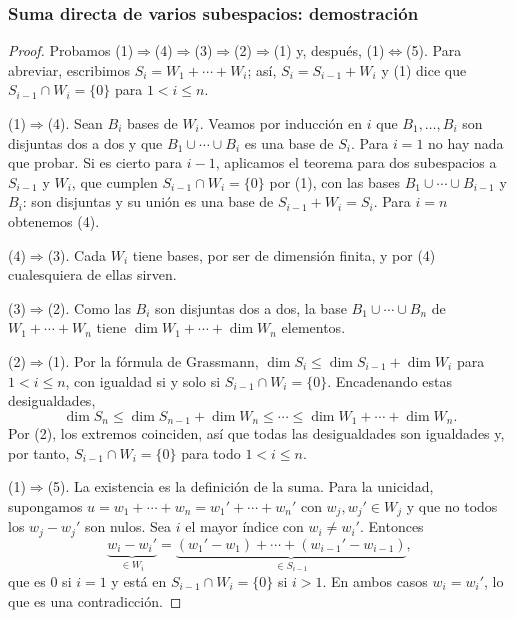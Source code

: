 \begin{frame}[allowframebreaks, t]
    \frametitle{Suma directa de varios subespacios: demostración}

    \begin{proof}
        Probamos (1)$\Rightarrow$(4)$\Rightarrow$(3)$\Rightarrow$(2)$\Rightarrow$(1)
        y, después, (1)$\Leftrightarrow$(5). Para abreviar, escribimos
        $S_i=W_1+\cdots+W_i$; así, $S_i=S_{i-1}+W_i$ y (1) dice que
        $S_{i-1}\cap W_i=\{0\}$ para $1<i\leq n$.

        \alert{(1)$\Rightarrow$(4).} Sean $B_i$ bases de $W_i$. Veamos por
        inducción en $i$ que $B_1,\ldots,B_i$ son disjuntas dos a dos y que
        $B_1\cup\cdots\cup B_i$ es una base de $S_i$. Para $i=1$ no hay
        nada que probar. Si es cierto para $i-1$, aplicamos el teorema para
        dos subespacios a $S_{i-1}$ y $W_i$, que cumplen
        $S_{i-1}\cap W_i=\{0\}$ por (1), con las bases
        $B_1\cup\cdots\cup B_{i-1}$ y $B_i$: son disjuntas y su unión es una
        base de $S_{i-1}+W_i=S_i$. Para $i=n$ obtenemos (4).

        \medskip

        \alert{(4)$\Rightarrow$(3).} Cada $W_i$ tiene bases, por ser de
        dimensión finita, y por (4) cualesquiera de ellas sirven.

        \medskip

        \alert{(3)$\Rightarrow$(2).} Como las $B_i$ son disjuntas dos a dos,
        la base $B_1\cup\cdots\cup B_n$ de $W_1+\cdots+W_n$ tiene
        $\dim W_1+\cdots+\dim W_n$ elementos.

        \framebreak

        \alert{(2)$\Rightarrow$(1).} Por la fórmula de Grassmann,
        $\dim S_i\leq\dim S_{i-1}+\dim W_i$ para $1<i\leq n$, con igualdad
        si y solo si $S_{i-1}\cap W_i=\{0\}$. Encadenando estas
        desigualdades,
        \[
            \dim S_n\leq\dim S_{n-1}+\dim W_n\leq\cdots
            \leq\dim W_1+\cdots+\dim W_n.
        \]
        Por (2), los extremos coinciden, así que todas las desigualdades
        son igualdades y, por tanto, $S_{i-1}\cap W_i=\{0\}$ para todo
        $1<i\leq n$.

        \medskip

        \alert{(1)$\Rightarrow$(5).} La existencia es la definición de la
        suma. Para la unicidad, supongamos
        $u=w_1+\cdots+w_n=w_1'+\cdots+w_n'$ con $w_j,w_j'\in W_j$ y que no
        todos los $w_j-w_j'$ son nulos. Sea $i$ el mayor índice con
        $w_i\neq w_i'$. Entonces
        \[
            \underbrace{w_i-w_i'}_{\in W_i}
            =\underbrace{(w_1'-w_1)+\cdots+(w_{i-1}'-w_{i-1})}_{\in S_{i-1}},
        \]
        que es $0$ si $i=1$ y está en $S_{i-1}\cap W_i=\{0\}$ si $i>1$. En
        ambos casos $w_i=w_i'$, lo que es una contradicción.


\end{proof}
\end{frame}
